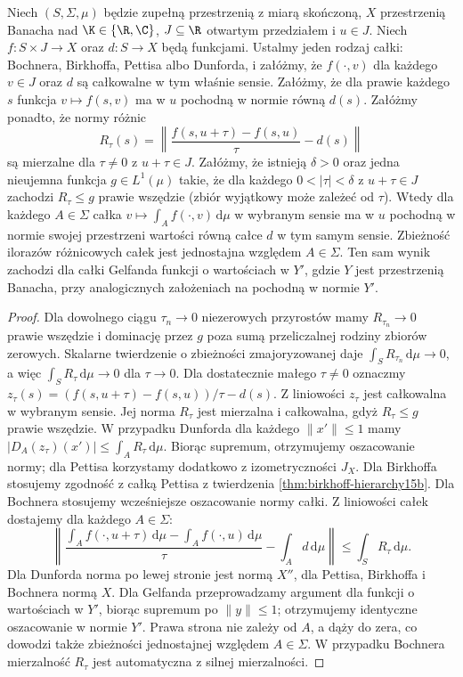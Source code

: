 \begin{twierdzenie}
\label{thm:norm-parametric-differentiation15b}
Niech $(S,\Sigma,\mu)$ będzie zupełną przestrzenią z
miarą skończoną, $X$ przestrzenią Banacha nad
$\K\in\{\R,\C\}$, $J\subseteq\R$ otwartym przedziałem
i $u\in J$. Niech $f:S\times J\to X$ oraz $d:S\to X$ będą
funkcjami. Ustalmy jeden rodzaj całki: Bochnera,
Birkhoffa, Pettisa albo Dunforda, i załóżmy, że $f(\cdot,v)$
dla każdego $v\in J$ oraz $d$ są całkowalne w tym
właśnie sensie. Załóżmy, że dla
prawie każdego $s$ funkcja $v\mapsto f(s,v)$ ma
w $u$ pochodną w normie równą $d(s)$.
Załóżmy ponadto, że normy różnic
\[
 R_\tau(s)=\left\|
 \frac{f(s,u+\tau)-f(s,u)}{\tau}-d(s)\right\|
\]
są mierzalne dla $\tau\ne0$ z $u+\tau\in J$.
Załóżmy, że istnieją $\delta>0$ oraz jedna nieujemna
funkcja $g\in L^1(\mu)$ takie, że dla każdego
$0<|\tau|<\delta$ z $u+\tau\in J$ zachodzi
$R_\tau\le g$ prawie wszędzie (zbiór wyjątkowy
może zależeć od $\tau$).
Wtedy dla każdego $A\in\Sigma$ całka
$v\mapsto\int_A f(\cdot,v)\,\mathrm d\mu$
w wybranym sensie ma w $u$ pochodną w normie swojej
przestrzeni wartości równą całce $d$ w tym samym sensie.
Zbieżność ilorazów różnicowych całek jest jednostajna
względem $A\in\Sigma$. Ten sam wynik zachodzi dla
całki Gelfanda funkcji o wartościach w $Y'$,
gdzie $Y$ jest przestrzenią Banacha, przy analogicznych
założeniach na pochodną w normie $Y'$.
\end{twierdzenie}
\begin{proof}
Dla dowolnego ciągu $\tau_n\to0$ niezerowych przyrostów
mamy $R_{\tau_n}\to0$ prawie wszędzie i dominację
przez $g$ poza sumą przeliczalnej rodziny zbiorów
zerowych. Skalarne twierdzenie o zbieżności
zmajoryzowanej daje $\int_S R_{\tau_n}\,\mathrm d\mu\to0$,
a więc $\int_S R_\tau\,\mathrm d\mu\to0$ dla $\tau\to0$.
Dla dostatecznie małego $\tau\ne0$ oznaczmy
$z_\tau(s)=(f(s,u+\tau)-f(s,u))/\tau-d(s)$.
Z liniowości $z_\tau$ jest całkowalna w wybranym
sensie. Jej norma $R_\tau$ jest mierzalna
i całkowalna, gdyż $R_\tau\le g$ prawie wszędzie.
W przypadku Dunforda dla każdego $\|x'\|\le1$ mamy
$|D_A(z_\tau)(x')|\le\int_A R_\tau\,\mathrm d\mu$.
Biorąc supremum, otrzymujemy oszacowanie normy;
dla Pettisa korzystamy dodatkowo z izometryczności
$J_X$. Dla Birkhoffa stosujemy zgodność z całką Pettisa
z twierdzenia \ref{thm:birkhoff-hierarchy15b}.
Dla Bochnera stosujemy wcześniejsze oszacowanie
normy całki. Z liniowości całek dostajemy dla każdego
$A\in\Sigma$:
\[
 \left\|\frac{\int_A f(\cdot,u+\tau)\,\mathrm d\mu
                   -\int_A f(\cdot,u)\,\mathrm d\mu}{\tau}
               -\int_A d\,\mathrm d\mu\right\|
 \le\int_S R_\tau\,\mathrm d\mu.
\]
Dla Dunforda norma po lewej stronie jest normą
$X''$, dla Pettisa, Birkhoffa i Bochnera normą $X$.
Dla Gelfanda przeprowadzamy argument dla funkcji
o wartościach w $Y'$, biorąc supremum po $\|y\|\le1$;
otrzymujemy identyczne oszacowanie w normie $Y'$.
Prawa strona nie zależy od $A$, a dąży do zera,
co dowodzi także zbieżności jednostajnej względem
$A\in\Sigma$.
W przypadku Bochnera mierzalność $R_\tau$ jest
automatyczna z silnej mierzalności.
\end{proof}

